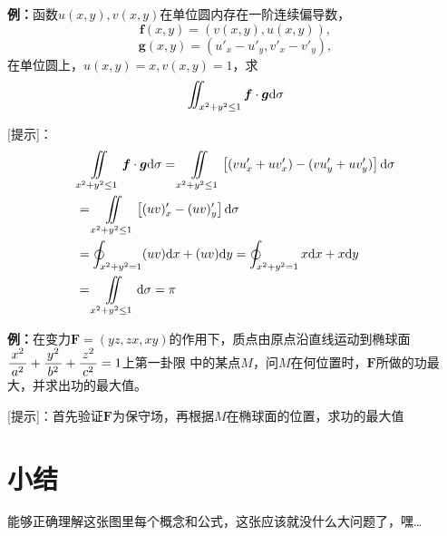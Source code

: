 {\bf 例：}函数$u(x,y),v(x,y)$在单位圆内存在一阶连续偏导数，
$$\bm{f}(x,y)=(v(x,y),u(x,y)),$$
$$\bm{g}(x,y)=\left(u'_x-u'_y,v'_x-v'_y\right),$$
在单位圆上，$u(x,y)=x,v(x,y)=1$，求
$$\iint_{x^2+y^2\leq 1}\bm{f}\cdot\bm{g}\mathrm{d}\sigma$$

[提示]：
\begin{align}
	&\iint\limits_{x^2+y^2\leq 1}\bm{f}\cdot\bm{g}\mathrm{d}\sigma\notag
    =\iint\limits_{x^2+y^2\leq 1}\left[(vu'_x+uv'_x)-
	(vu'_y+uv'_y)\right]\mathrm{d}\sigma\notag\\
	&=\iint\limits_{x^2+y^2\leq 1}\left[(uv)'_x-(uv)'_y\right]
	\mathrm{d}\sigma\notag\\
	&=\oint_{x^2+y^2=1}(uv)\mathrm{d} x+(uv)\mathrm{d} y
	=\oint_{x^2+y^2=1}x\mathrm{d} x+x\mathrm{d} y\notag\\
	&=\iint\limits_{x^2+y^2\leq 1}\mathrm{d}\sigma=\pi\notag
\end{align}

{\bf 例：}在变力$\bm{F}=(yz,zx,xy)$的作用下，质点由原点沿直线运动到椭球面
$\displaystyle\frac{\,{x^2}\,}{\,{a^2}\,}+\displaystyle\frac{\,{y^2}\,}{\,{b^2}\,}+\displaystyle\frac{\,{z^2}\,}{\,{c^2}\,}=1$上第一卦限
中的某点$M$，问$M$在何位置时，$\bm{F}$所做的功最大，并求出功的最大值。

[提示]：首先验证$\bm{F}$为保守场，再根据$M$在椭球面的位置，求功的最大值

\section{小结}

能够正确理解这张图里每个概念和公式，这张应该就没什么大问题了，嘿\ldots

\bigskip

